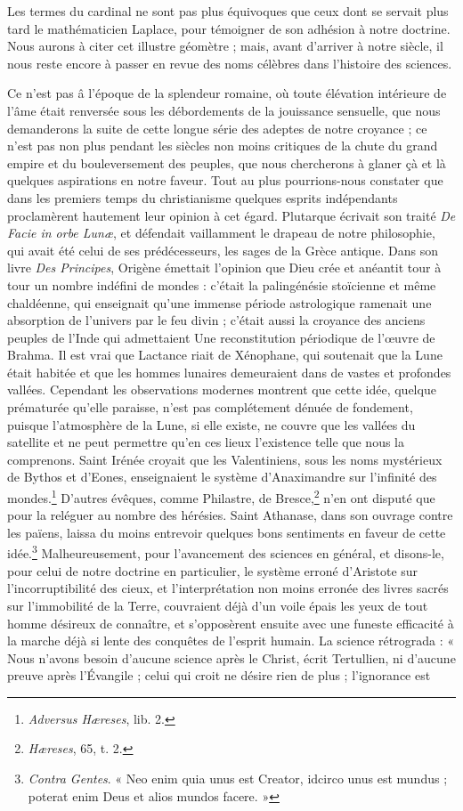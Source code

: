 \documentclass[a4paper, 11pt, oneside, landscape]{article}
\begin{document}
Les termes du cardinal ne sont pas plus équivoques que ceux dont se servait plus tard le mathématicien Laplace, pour témoigner de son adhésion à notre doctrine. Nous aurons à citer cet illustre géomètre ; mais, avant d'arriver à notre siècle, il nous reste encore à passer en revue des noms célèbres dans l'histoire des sciences.

Ce n'est pas â l'époque de la splendeur romaine, où toute élévation intérieure de l'âme était renversée sous les débordements de la jouissance sensuelle, que nous demanderons la suite de cette longue série des adeptes de notre croyance ; ce n'est pas non plus pendant les siècles non moins critiques de la chute du grand empire et du bouleversement des peuples, que nous chercherons à glaner çà et là quelques aspirations en notre faveur. Tout au plus pourrions-nous constater que dans les premiers temps du christianisme quelques esprits indépendants proclamèrent hautement leur opinion à cet égard. Plutarque écrivait son traité \emph{De Facie in orbe Lunæ}, et défendait vaillamment le drapeau de notre philosophie, qui avait été celui de ses prédécesseurs, les sages de la Grèce antique. Dans son livre \emph{Des Principes}, Origène émettait l'opinion que Dieu crée et anéantit tour à tour un nombre indéfini de mondes : c'était la palingénésie stoïcienne et même chaldéenne, qui enseignait qu'une immense période astrologique ramenait une absorption de l'univers par le feu divin ; c'était aussi la croyance des anciens peuples de l'Inde qui admettaient Une reconstitution périodique de l'œuvre de Brahma. Il est vrai que Lactance riait de Xénophane, qui soutenait que la Lune était habitée et que les hommes lunaires demeuraient dans de vastes et profondes vallées. Cependant les observations modernes montrent que cette idée, quelque prématurée qu'elle paraisse, n'est pas complétement dénuée de fondement, puisque l'atmosphère de la Lune, si elle existe, ne couvre que les vallées du satellite et ne peut permettre qu'en ces lieux l'existence telle que nous la comprenons. Saint Irénée croyait que les Valentiniens, sous les noms mystérieux de Bythos et d'Eones, enseignaient le système d'Anaximandre sur l'infinité des mondes.\footnote{\emph{Adversus Hæreses}, lib. 2.} D'autres évêques, comme Philastre, de Bresce,\footnote{\emph{Hæreses}, 65, t. 2.} n'en ont disputé que pour la reléguer au nombre des hérésies. Saint Athanase, dans son ouvrage contre les païens, laissa du moins entrevoir quelques bons sentiments en faveur de cette idée.\footnote{\emph{Contra Gentes}. « Neo enim quia unus est Creator, idcirco unus est mundus ; poterat enim Deus et alios mundos facere. »} Malheureusement, pour l'avancement des sciences en général, et disons-le, pour celui de notre doctrine en particulier, le système erroné d'Aristote sur l'incorruptibilité des cieux, et l'interprétation non moins erronée des livres sacrés sur l'immobilité de la Terre, couvraient déjà d'un voile épais les yeux de tout homme désireux de connaître, et s'opposèrent ensuite avec une funeste efficacité à la marche déjà si lente des conquêtes de l'esprit humain. La science rétrograda : « Nous n'avons besoin d'aucune science après le Christ, écrit Tertullien, ni d'aucune preuve après l'Évangile ; celui qui croit ne désire rien de plus ; l'ignorance est 
\end{document}
